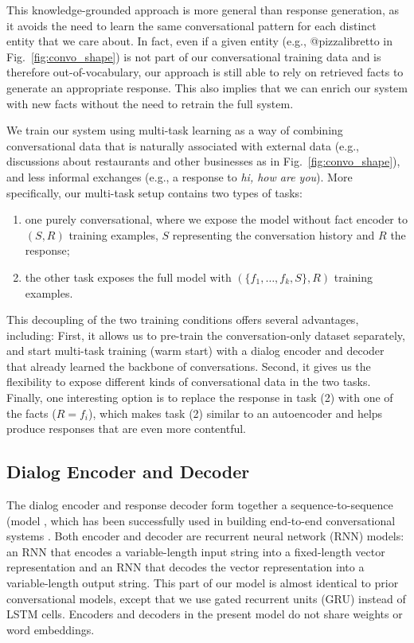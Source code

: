 \documentclass[letterpaper]{article}
\begin{document}
This knowledge-grounded approach is more general than \sts response generation, as it avoids the need to learn the same conversational pattern for each distinct entity that we care about.
In fact, even if a given entity (e.g., @pizzalibretto in Fig.~\ref{fig:convo_shape})
is not part of our conversational training data and is therefore out-of-vocabulary, our approach is still able to rely on retrieved facts to generate an appropriate response.
This also implies that we can enrich our system with new facts without the need to retrain the full system.

We train our system using multi-task learning \cite{Caruana:1997,luong2015multi} as a way of combining conversational data that is naturally associated with external data (e.g., discussions about restaurants and other businesses as in Fig.~\ref{fig:convo_shape}), and less
informal
exchanges (e.g., a response to {\it hi, how are you}).
More specifically, our multi-task setup contains two types of tasks:
\begin{enumerate}[{(1)}]
\item one purely conversational, where we expose the model without fact encoder to $(S,R)$ training examples, $S$ representing the conversation history and $R$ the response;
\item the other task exposes the full model with $(\{f_1,\ldots,f_k,S\},R)$ training examples.
\end{enumerate}
This decoupling of the two training conditions offers several advantages, including:
First, it allows us to pre-train the conversation-only dataset separately, and start multi-task training (warm start) with a dialog encoder and decoder that already learned the backbone of conversations.
Second, it gives us the flexibility to expose different kinds of conversational data in the two tasks.
Finally, one interesting option is to replace the response in task (2) with one of the facts ($R=f_i$), which makes task (2) similar to an autoencoder and helps produce responses that are even more contentful.

\subsection{Dialog Encoder and Decoder}

The dialog encoder and response decoder form together a sequence-to-sequence (\sts model \cite{hochreiter1997long,sutskever2014sequence}, which has been successfully used in building end-to-end conversational systems \cite{sordoni2015,vinyals2015neural,li2016diversity}. Both encoder and decoder are recurrent neural network (RNN) models: an RNN that encodes a variable-length input string into a fixed-length vector representation and an RNN that decodes the vector representation into a variable-length output string. This part of our model is almost identical to prior conversational \sts models, except that we use gated recurrent units (GRU) \cite{gru:2014} instead of LSTM \cite{hochreiter1997long} cells. Encoders and decoders in  the present model do not share weights or word embeddings.
\end{document}
